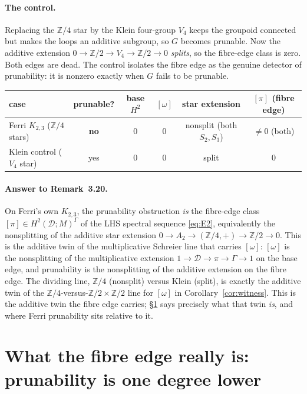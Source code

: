\documentclass[11pt]{article}
\theoremstyle{definition}
\newcommand{\D}{\mathcal{D}}
\newcommand{\Z}{\mathbb{Z}}
\begin{document}
\paragraph{The control.} Replacing the $\Z/4$ star by the Klein four-group $V_4$ keeps the
groupoid connected but makes the loops an additive subgroup, so $G$ becomes prunable. Now the
additive extension $0\to\Z/2\to V_4\to\Z/2\to0$ \emph{splits}, so the fibre-edge class is
zero. Both edges are dead. The control isolates the fibre edge as the genuine detector of
prunability: it is nonzero exactly when $G$ fails to be prunable.

\begin{center}\small
\begin{tabular}{lccccc}
\toprule
case & prunable? & base $H^2$ & $[\omega]$ & star extension & $[\pi]$ (fibre edge)\\
\midrule
Ferri $K_{2,3}$ ($\Z/4$ stars) & \textbf{no}  & $0$ & $0$ & nonsplit (both $S_2,S_3$) & $\neq0$ (both)\\
Klein control ($V_4$ star)     & yes          & $0$ & $0$ & split                      & $0$\\
\bottomrule
\end{tabular}
\end{center}

\paragraph{Answer to Remark~3.20.} On Ferri's own $K_{2,3}$, the prunability obstruction
\emph{is} the fibre-edge class $[\pi]\in H^2(\D;M)^\Gamma$ of the LHS spectral sequence
\eqref{eq:E2}, equivalently the nonsplitting of the additive star extension
$0\to A_2\to(\Z/4,+)\to\Z/2\to0$. This is the additive twin of the multiplicative Schreier
line that carries $[\omega]$: $[\omega]$ is the nonsplitting of the multiplicative extension
$1\to\D\to\pi\to\Gamma\to1$ on the base edge, and prunability is the nonsplitting of the
additive extension on the fibre edge. The dividing line, $\Z/4$ (nonsplit) versus Klein
(split), is exactly the additive twin of the $\Z/4$-versus-$\Z/2\times\Z/2$ line for
$[\omega]$ in Corollary~\ref{cor:witness}. This is the additive twin the fibre
edge carries; \S\ref{sec:fibretruth} says precisely what that twin \emph{is}, and where Ferri
prunability sits relative to it.

\section{What the fibre edge really is: prunability is one degree lower}\label{sec:fibretruth}
\end{document}
